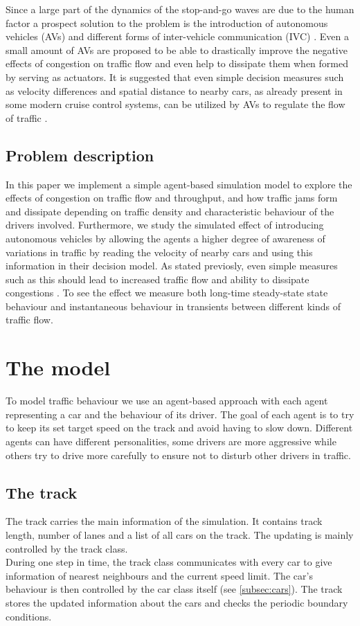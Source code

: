 \documentclass[11pt,a4paper,twocolumn]{article}
\begin{document}
Since a large part of the dynamics of the stop-and-go waves are due to the human factor a prospect solution to the problem is the introduction of autonomous vehicles (AVs) and different forms of inter-vehicle communication (IVC) \cite{stern17autonomous, darbha1999cruisecontrol, bauza2013vehicle2vehicle, fagnant2015autonomous}. Even a small amount of AVs are proposed to be able to drastically improve the negative effects of congestion on traffic flow and even help to dissipate them when formed by serving as actuators. It is suggested that even simple decision measures such as velocity differences and spatial distance to nearby cars, as already present in some modern cruise control systems, can be utilized by AVs to regulate the flow of traffic \cite{stern17autonomous}.
\subsection{Problem description}
In this paper we implement a simple agent-based simulation model to explore the effects of congestion on traffic flow and throughput, and how traffic jams form and dissipate depending on traffic density and characteristic behaviour of the drivers involved. Furthermore, we study the simulated effect of introducing autonomous vehicles by allowing the agents a higher degree of awareness of variations in traffic by reading the velocity of nearby cars and using this information in their decision model. As stated previosly, even simple measures such as this should lead to increased traffic flow and ability to dissipate congestions \cite{stern17autonomous}. To see the effect we measure both long-time steady-state state behaviour and instantaneous behaviour in transients between different kinds of traffic flow.

\section{The model}
To model traffic behaviour we use an agent-based approach with each agent representing a car and the behaviour of its driver. The goal of each agent is to try to keep its set target speed on the track and avoid having to slow down. Different agents can have different personalities, some drivers are more aggressive while others try to drive more carefully to ensure not to disturb other drivers in traffic.

\subsection{The track}\label{subsec:track}
The track carries the main information of the simulation. It contains track length, number of lanes and a list of all cars on the track. The updating is mainly controlled by the track class.  \\
During one step in time, the track class communicates with every car to give information of nearest neighbours and the current speed limit. The car's behaviour is then controlled by the car class itself (see \ref{subsec:cars}). The track stores the updated information about the cars and checks the periodic boundary conditions. \\
\end{document}
